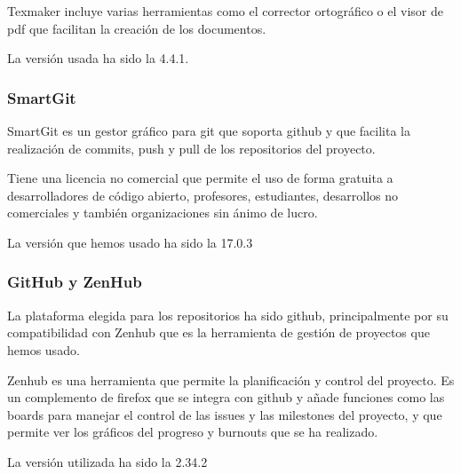 Texmaker incluye varias herramientas como el corrector ortográfico o el visor de pdf que facilitan la creación de los documentos.

La versión usada ha sido la 4.4.1.

\subsubsection{SmartGit}
SmartGit es un gestor gráfico para git que soporta github y que facilita la realización de commits, push y pull de los repositorios del proyecto.

Tiene una licencia no comercial que permite el uso de forma gratuita a desarrolladores de código abierto, profesores, estudiantes, desarrollos no comerciales y también organizaciones sin ánimo de lucro.

La versión que hemos usado ha sido la 17.0.3

\subsubsection{GitHub y ZenHub}
La plataforma elegida para los repositorios ha sido github, principalmente por su compatibilidad con Zenhub que es la herramienta de gestión de proyectos que hemos usado.

Zenhub es una herramienta que permite la planificación y control del proyecto. Es un complemento de firefox que se integra con github y añade funciones como las boards para manejar el control de las issues y las milestones del proyecto, y que permite ver los gráficos del progreso y burnouts que se ha realizado.

La versión utilizada ha sido la 2.34.2

